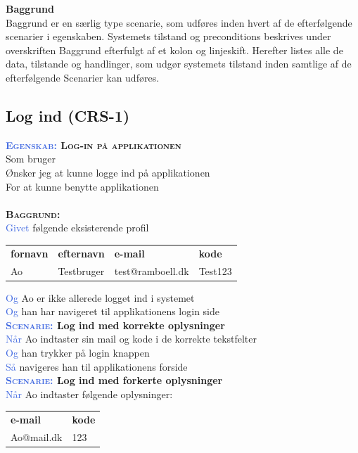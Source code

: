 \large{\textbf{Baggrund}}\\
Baggrund er en særlig type scenarie, som udføres inden hvert af de 
efterfølgende scenarier	i egenskaben. Systemets tilstand og preconditions 
beskrives under overskriften Baggrund efterfulgt af et kolon og 
linjeskift. Herefter listes alle de data, tilstande og handlinger, som udgør 
systemets tilstand inden samtlige af de efterfølgende Scenarier kan	udføres.


\subsection{Log ind (CRS-1)} \label{sec:USLogInd}
\textbf{\textsc{\textcolor{RoyalBlue} {Egenskab:} Log-in på applikationen}} \\
Som bruger\\
Ønsker jeg at kunne logge ind på applikationen\\
For at kunne benytte applikationen\\ \\

\textbf{\textsc{\color{RoyalBlue}Baggrund:}}\\
\textcolor{RoyalBlue}{Givet} følgende eksisterende profil\\
\begin{tabular}{| l | l | l | l |}
	\textbf{fornavn} & \textbf{efternavn} & \textbf{e-mail} & \textbf{kode} \\
	Ao & Testbruger & test@ramboell.dk & Test123\\
\end{tabular}
\newline \newline
\textcolor{RoyalBlue}{Og} Ao er ikke allerede logget ind i systemet\\
\textcolor{RoyalBlue}{Og} han har navigeret til applikationens login side\\

\textbf{\textsc{\textcolor{RoyalBlue}{Scenarie:}} Log ind med korrekte oplysninger}\\
\textcolor{RoyalBlue}{Når} Ao indtaster sin mail og kode i de korrekte tekstfelter\\
\textcolor{RoyalBlue}{Og} han trykker på login knappen\\
\textcolor{RoyalBlue}{Så} navigeres han til applikationens forside\\

\textbf{\textsc{\textcolor{RoyalBlue}{Scenarie:}} Log ind med forkerte oplysninger} \\
\textcolor{RoyalBlue}{Når} Ao indtaster følgende oplysninger:\\
\begin{tabular}{| l | l |}
	\textbf{e-mail} & \textbf{kode}\\
	Ao@mail.dk & 123\\
\end{tabular}


